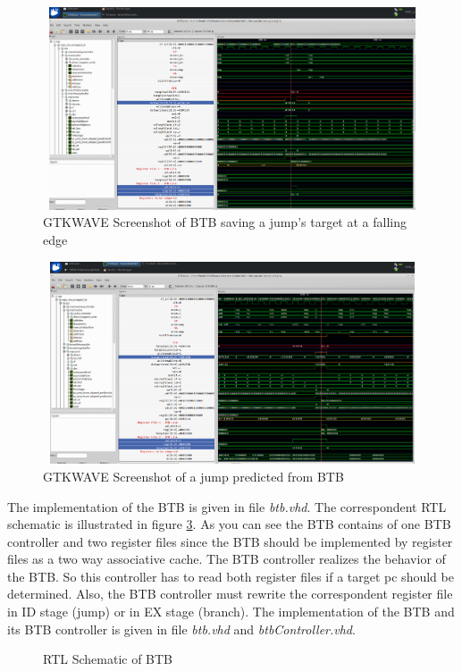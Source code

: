 \begin{figure}
	\centering
	\includegraphics[width=1\textwidth, height=6cm, keepaspectratio]{pictures/BTB_FirstJump}
	\caption{GTKWAVE Screenshot of BTB saving a jump's target at a falling edge}
	\label{fig5-3}
\end{figure}

\begin{figure}[h!]
	\centering
	\includegraphics[width=1\textwidth, height=6cm, keepaspectratio]{pictures/BTB_SecondJump}
	\caption{GTKWAVE Screenshot of a jump predicted from BTB}
	\label{fig5-4}
\end{figure}

\newpage
The implementation of the BTB is given in file \textit{btb.vhd}. The correspondent RTL schematic is illustrated in figure \ref{fig:rtlBTB}. As you can see the BTB contains of one BTB controller and two register files since the BTB should be implemented by register files as a two way associative cache. The BTB controller realizes the behavior of the BTB. So this controller has to read both register files if a target pc should be determined. Also, the BTB controller must rewrite the correspondent register file in ID stage (jump) or in EX stage (branch). The implementation of the BTB and its BTB controller is given in file \textit{btb.vhd} and \textit{btbController.vhd}.

\begin{figure}[h!]
\begin{minipage}[t]{0.5\textwidth} 
	\centering
   	
	\caption{RTL Schematic of BTB}
	\label{fig:rtlBTB}
\end{minipage}
\end{figure}
\newpage
 



